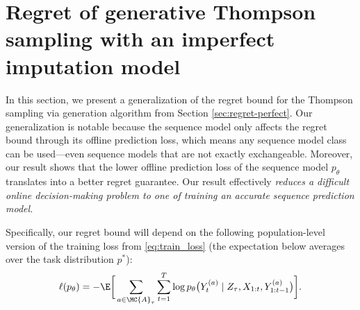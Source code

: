 \section{Regret of generative Thompson sampling with an imperfect imputation model}
\label{sec:regret}
In this section, we present a generalization of the regret bound for the Thompson sampling via generation algorithm from Section \ref{sec:regret-perfect}. Our generalization is notable because the sequence model only affects the regret bound through its offline prediction loss, which means any sequence model class can be used---even sequence models that are not exactly exchangeable. Moreover, our result shows that the lower offline prediction loss of the sequence model $p_\theta$ translates into a better regret guarantee. Our result effectively \textit{reduces a difficult online decision-making problem to one of training an accurate sequence prediction model.} 

Specifically, our regret bound will depend on the following population-level version of the training loss from \eqref{eq:train_loss} (the expectation below averages over the task distribution $p^*$):
\begin{align}
    \ell(p_\theta) = - \E \bigg[ \sum_{a \in \MC{A}_{\tau}} \sum_{t=1}^T \log p_{\theta} \big( Y_t^{(a)} \mid Z_{\tau}, X_{1:t}, Y_{1:t-1}^{(a)} \big) \bigg].
    \label{eq:pop_loss}
\end{align}


